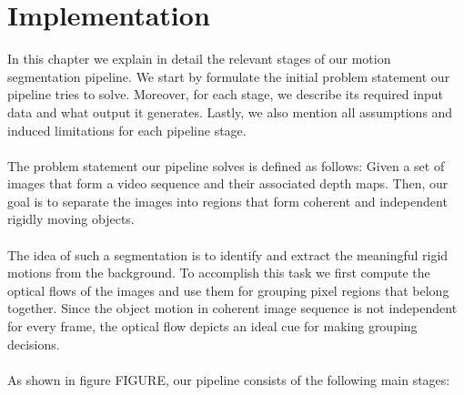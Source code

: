 \chapter{Implementation}


In this chapter we explain in detail the relevant stages of our motion segmentation pipeline. We start by formulate the initial problem statement our pipeline tries to solve. Moreover, for each stage, we describe its required input data and what output it generates. Lastly, we also mention all assumptions and induced limitations for each pipeline stage. \\ \\
The problem statement our pipeline solves is defined as follows: Given a set of images that form a video sequence and their associated depth maps. Then, our goal is to separate the images into regions that form coherent and independent rigidly moving objects. \\ \\
The idea of such a segmentation is to identify and extract the meaningful rigid motions from the background. To accomplish this task we first compute the optical flows of the images and use them for grouping pixel regions that belong together. Since the object motion in coherent image sequence is not independent for every frame, the optical flow depicts an ideal cue for making grouping decisions. \\ \\
As shown in figure FIGURE, our pipeline consists of the following main stages:
